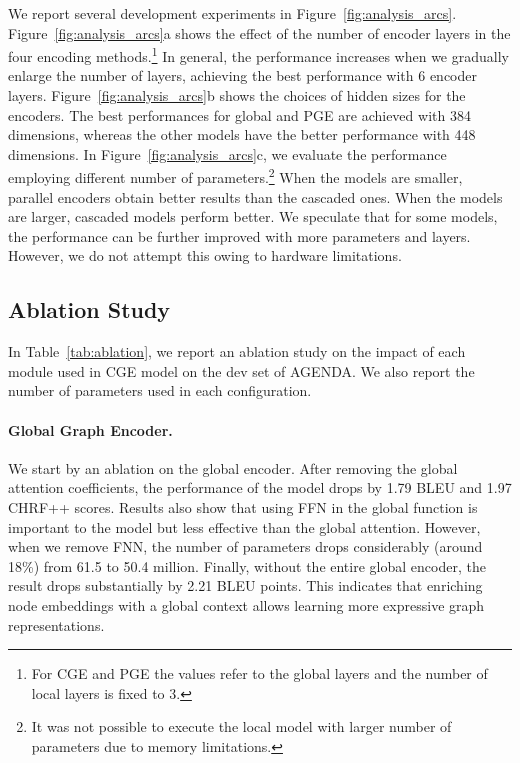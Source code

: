 \documentclass[11pt,a4paper]{article}
\begin{document}
We report several development experiments in Figure~\ref{fig:analysis_arcs}. Figure~\ref{fig:analysis_arcs}a shows the effect of the number of encoder layers in the four encoding methods.\footnote{For {\selectfont CGE} and {\selectfont PGE} the values refer to the global layers and the number of local layers is fixed to 3.}  In general, the performance increases when we gradually enlarge the number of layers, achieving the best performance with 6 encoder layers. Figure~\ref{fig:analysis_arcs}b shows the choices of hidden sizes for the encoders. The best performances for global and {\selectfont PGE} are achieved with 384 dimensions, whereas the other models have the better performance with 448 dimensions. In Figure~\ref{fig:analysis_arcs}c, we evaluate the performance employing different number of parameters.\footnote{It was not possible to execute the local model with larger number of parameters due to memory limitations.} When the models are smaller, parallel encoders obtain better results than the cascaded ones. When the models are larger, cascaded models perform better. We speculate that for some models, the performance can be further improved with more parameters and layers. However, we do not attempt this owing to hardware limitations.



\subsection{Ablation Study} In Table~\ref{tab:ablation}, we report an ablation study on the impact of each module used in {\selectfont CGE} model on the dev set of AGENDA. We also report the number of parameters used in each configuration. 
\paragraph{Global Graph Encoder.} We start by an ablation on the global encoder. After removing the global attention coefficients, the performance of the model drops by 1.79 BLEU and 1.97 CHRF++ scores. Results also show that using FFN in the global  function is important to the model but less effective than the global attention. However, when we remove FNN, the number of parameters drops considerably (around 18\%) from 61.5 to 50.4 million. Finally, without the entire global encoder, the result drops substantially by 2.21 BLEU points. This indicates that enriching node embeddings with a global context allows learning more expressive graph representations.
\end{document}
